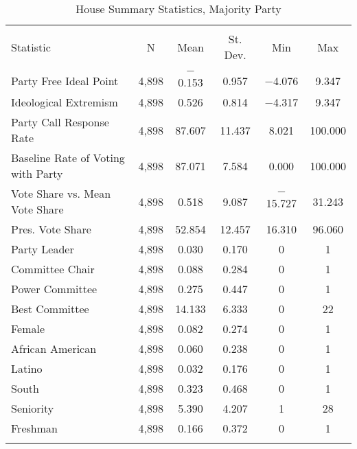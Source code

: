 \documentclass[12pt]{article}
\begin{document}
\begin{table}[H] 
	\centering 
	\singlespacing
	\caption{House Summary Statistics, Majority Party} 
	\label{} 
	\begin{tabular}{@{\extracolsep{5pt}}lccccc} 
		\\[-1.8ex]\hline 
		\hline \\[-1.8ex] 
		Statistic & \multicolumn{1}{c}{N} & \multicolumn{1}{c}{Mean} & \multicolumn{1}{c}{St. Dev.} & \multicolumn{1}{c}{Min} & \multicolumn{1}{c}{Max} \\ 
		\hline \\[-1.8ex]  
		Party Free Ideal Point & 4,898 & $-$0.153 & 0.957 & $-$4.076 & 9.347 \\  
		Ideological Extremism & 4,898 & 0.526 & 0.814 & $-$4.317 & 9.347 \\ 
		Party Call Response Rate & 4,898 & 87.607 & 11.437 & 8.021 & 100.000 \\ 
		Baseline Rate of Voting with Party & 4,898 & 87.071 & 7.584 & 0.000 & 100.000 \\
	 	Vote Share vs. Mean Vote Share & 4,898 & 0.518 & 9.087 & $-$15.727 & 31.243 \\ 
	 	Pres. Vote Share & 4,898 & 52.854 & 12.457 & 16.310 & 96.060 \\
	 	Party Leader & 4,898 & 0.030 & 0.170 & 0 & 1 \\ 
	 	Committee Chair & 4,898 & 0.088 & 0.284 & 0 & 1 \\ 
	 	Power Committee & 4,898 & 0.275 & 0.447 & 0 & 1 \\ 
	 	Best Committee & 4,898 & 14.133 & 6.333 & 0 & 22 \\ 
		Female & 4,898 & 0.082 & 0.274 & 0 & 1 \\ 
		African American & 4,898 & 0.060 & 0.238 & 0 & 1 \\ 
		Latino & 4,898 & 0.032 & 0.176 & 0 & 1 \\  
		South & 4,898 & 0.323 & 0.468 & 0 & 1 \\
		Seniority & 4,898 & 5.390 & 4.207 & 1 & 28 \\   
		Freshman & 4,898 & 0.166 & 0.372 & 0 & 1 \\ 
		\hline \\[-1.8ex] 
	\end{tabular} 
\end{table} 
\end{document}
